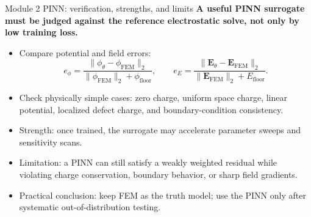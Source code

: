 \documentclass[aspectratio=169,10pt]{beamer}
\begin{document}
\begin{frame}{Module 2 PINN: verification, strengths, and limits}
\small
\textbf{A useful PINN surrogate must be judged against the reference electrostatic solve, not only by low training loss.}

\vspace{-0.1em}
\begin{itemize}
    \item Compare potential and field errors:
    \[
        e_{\phi}=\frac{\|\phi_{\theta}-\phi_{\mathrm{FEM}}\|_2}
        {\|\phi_{\mathrm{FEM}}\|_2+\phi_{\mathrm{floor}}},
        \qquad
        e_E=\frac{\|\mathbf E_{\theta}-\mathbf E_{\mathrm{FEM}}\|_2}
        {\|\mathbf E_{\mathrm{FEM}}\|_2+E_{\mathrm{floor}}}.
    \]
    \item Check physically simple cases: zero charge, uniform space charge, linear potential, localized defect charge, and boundary-condition consistency.
    \item Strength: once trained, the surrogate may accelerate parameter sweeps and sensitivity scans.
    \item Limitation: a PINN can still satisfy a weakly weighted residual while violating charge conservation, boundary behavior, or sharp field gradients.
    \item Practical conclusion: keep FEM as the truth model; use the PINN only after systematic out-of-distribution testing.
\end{itemize}
\end{frame}
\end{document}
